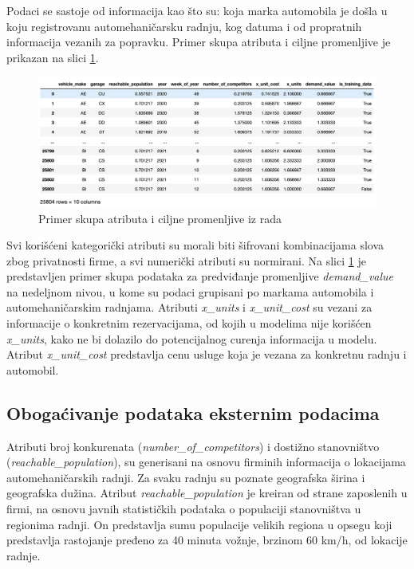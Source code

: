 \documentclass[12pt,oneside]{memoir}
\begin{document}
Podaci se sastoje od informacija kao što su: koja marka automobila je došla u koju registrovanu automehaničarsku radnju, kog datuma i od propratnih informacija vezanih za popravku. Primer skupa atributa i ciljne promenljive je prikazan na slici \ref{fig:atributi}.
\begin{figure}[!ht]
  \centering
  \includegraphics[width=1\textwidth]{./grafici/atributi_primer.png}
  \caption{Primer skupa atributa i ciljne promenljive iz rada}    
  \label{fig:atributi}
\end{figure}
Svi korišćeni kategorički atributi su morali biti šifrovani kombinacijama slova zbog privatnosti firme, a svi numerički atributi su normirani. Na slici \ref{fig:atributi} je predstavljen primer skupa podataka za predviđanje promenljive \textit{demand\_value} na nedeljnom nivou, u kome su podaci grupisani po markama automobila i automehaničarskim radnjama. Atributi \textit{x\_units} i \textit{x\_unit\_cost} su vezani za informacije o konkretnim rezervacijama, od kojih u modelima nije korišćen \textit{x\_units}, kako ne bi dolazilo do potencijalnog curenja informacija u modelu. Atribut \textit{x\_unit\_cost} predstavlja cenu usluge koja je vezana za konkretnu radnju i automobil.

\subsection{Obogaćivanje podataka eksternim podacima}
Atributi broj konkurenata (\textit{number\_of\_competitors}) i dostižno stanovništvo (\textit{reachable\_population}), su generisani na osnovu firminih informacija o lokacijama automehaničarskih radnji. Za svaku radnju su poznate geografska širina i geografska dužina. Atribut \textit{reachable\_population} je kreiran od strane zaposlenih u firmi, na osnovu javnih statističkih podataka o populaciji stanovništva u regionima radnji. On predstavlja sumu populacije velikih regiona u opsegu koji predstavlja rastojanje pređeno za 40 minuta vožnje, brzinom 60 km/h, od lokacije radnje. 
\end{document}
